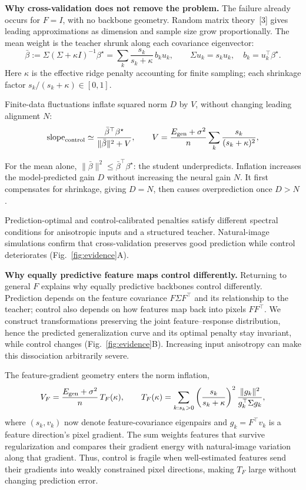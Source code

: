\documentclass[12pt,a4paper]{article}
\newcommand{\head}[1]{\par\noindent\textbf{#1}\enspace\ignorespaces}
\newcommand{\bt}{\beta^\star}
\newcommand{\mb}{\bar\beta}
\begin{document}
\head{Why cross-validation does not remove the problem.}
The failure already occurs for $F=I$, with no backbone geometry. Random matrix theory~[3] gives leading approximations as dimension and sample size grow proportionally. The mean weight is the teacher shrunk along each covariance eigenvector:
\begin{equation}
\mb:=\Sigma(\Sigma+\kappa I)^{-1}\bt
=\sum_k\frac{s_k}{s_k+\kappa}\,b_k u_k,
\qquad \Sigma u_k=s_k u_k,\quad b_k=u_k^\top\bt.
\label{eq:mean-shrinkage}
\end{equation}
Here $\kappa$ is the effective ridge penalty accounting for finite sampling; each shrinkage factor $s_k/(s_k+\kappa)\in[0,1]$.\par
Finite-data fluctuations inflate squared norm $D$ by $V$, without changing leading alignment $N$:
\begin{equation}
\mathrm{slope}_{\rm control}\simeq
\frac{\mb^\top\bt}{\|\mb\|^2+V},
\qquad
V=\frac{E_{\rm gen}+\sigma^2}{n}
\sum_k\frac{s_k}{(s_k+\kappa)^2},
\label{eq:inflation}
\end{equation}\par
For the mean alone, $\|\mb\|^2\le\mb^\top\bt$: the student underpredicts. Inflation increases the model-predicted gain $D$ without increasing the neural gain $N$. It first compensates for shrinkage, giving $D=N$, then causes overprediction once $D>N$.\par
Prediction-optimal and control-calibrated penalties satisfy different spectral conditions for anisotropic inputs and a structured teacher. Natural-image simulations confirm that cross-validation preserves good prediction while control deteriorates (Fig.~\ref{fig:evidence}A).\par

\head{Why equally predictive feature maps control differently.}
Returning to general $F$ explains why equally predictive backbones control differently. Prediction depends on the feature covariance $F\Sigma F^\top$ and its relationship to the teacher; control also depends on how features map back into pixels $FF^\top$. We construct transformations preserving the joint feature--response distribution, hence the predicted generalization curve and its optimal penalty stay invariant, while control changes (Fig.~\ref{fig:evidence}B). Increasing input anisotropy can make this dissociation arbitrarily severe.

The feature-gradient geometry enters the norm inflation, 
\begin{equation}
V_F=\frac{E_{\rm gen}+\sigma^2}{n}\,T_F(\kappa),
\qquad
T_F(\kappa)=\sum_{k:s_k>0}
\left(\frac{s_k}{s_k+\kappa}\right)^2
\frac{\|g_k\|^2}{g_k^\top\Sigma g_k},
\label{eq:features}
\end{equation}
where $(s_k,v_k)$ now denote feature-covariance eigenpairs and $g_k=F^\top v_k$ is a feature direction's pixel gradient. The sum weights features that survive regularization and compares their gradient energy with natural-image variation along that gradient. Thus, control is fragile when well-estimated features send their gradients into weakly constrained pixel directions, making $T_F$ large without changing prediction error.
\end{document}
